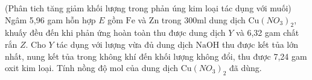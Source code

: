 \begin{vd}
	(Phân tich tăng giảm khối lượng trong phản úng kim loại tác dụng với muối)
	Ngâm 5,96 gam hỗn hợp $E$ gồm $\mathrm{Fe}$ và $\mathrm{Zn}$ trong $300\mathrm{ml}$ dung dịch $\mathrm{Cu}\left(NO_3\right)_2$, khuấy đều đến khi phản ứng hoàn toàn thu được dung dịch $Y$ và 6,32 gam chất rắn $Z$. Cho $Y$ tác dụng với lượng vừa đủ dung dịch $\mathrm{NaOH}$ thu được kết tủa lớn nhất, nung kết tủa trong không khí đến khối lượng không đổi, thu được 7,24 gam oxit kim loại. Tính nồng độ mol của dung dịch $\mathrm{Cu}\left(NO_3\right)_2$ đã dùng.
	\loigiai{
}
\end{vd}
